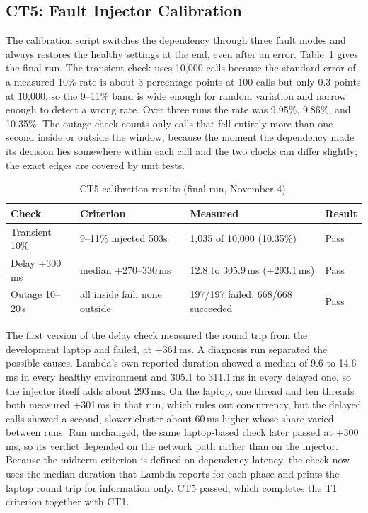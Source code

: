 \documentclass[10pt]{article}
\begin{document}
\subsection{CT5: Fault Injector Calibration}
The calibration script switches the dependency through three fault modes and
always restores the healthy settings at the end, even after an error.
Table~\ref{tab:ct5} gives the final run. The transient check uses 10{,}000 calls
because the standard error of a measured 10\% rate is about 3 percentage points
at 100 calls but only 0.3 points at 10{,}000, so the 9--11\% band is wide enough
for random variation and narrow enough to detect a wrong rate. Over three runs
the rate was 9.95\%, 9.86\%, and 10.35\%. The outage check counts only calls that
fell entirely more than one second inside or outside the window, because the
moment the dependency made its decision lies somewhere within each call and the
two clocks can differ slightly; the exact edges are covered by unit tests.

\begin{table}[htbp]
\centering
\footnotesize
\begin{tabular}{@{}llll@{}}
\toprule
\textbf{Check} & \textbf{Criterion} & \textbf{Measured} & \textbf{Result} \\
\midrule
Transient 10\% & 9--11\% injected 503s & 1{,}035 of 10{,}000 (10.35\%) & Pass \\
Delay +300\,ms & median +270--330\,ms & 12.8 to 305.9\,ms (+293.1\,ms) & Pass \\
Outage 10--20\,s & all inside fail, none outside & 197/197 failed, 668/668 succeeded & Pass \\
\bottomrule
\end{tabular}
\caption{CT5 calibration results (final run, November 4).}
\label{tab:ct5}
\end{table}

The first version of the delay check measured the round trip from the
development laptop and failed, at +361\,ms. A diagnosis run separated the
possible causes. Lambda's own reported duration showed a median of 9.6 to
14.6\,ms in every healthy environment and 305.1 to 311.1\,ms in every delayed
one, so the injector itself adds about 293\,ms. On the laptop, one thread and ten
threads both measured +301\,ms in that run, which rules out concurrency, but the
delayed calls showed a second, slower cluster about 60\,ms higher whose share
varied between runs. Run unchanged, the same laptop-based check later passed at
+300\,ms, so its verdict depended on the network path rather than on the
injector. Because the midterm criterion is defined on dependency latency, the
check now uses the median duration that Lambda reports for each phase and prints
the laptop round trip for information only. CT5 passed, which completes the T1
criterion together with CT1.
\end{document}
